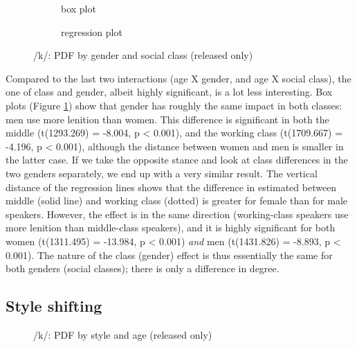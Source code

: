 \begin{figure}[h]
	\centering
	\begin{subfigure}{.49\textwidth}
		\centering
			\resizebox{\linewidth}{!}{} 
		\caption{box plot}
		\label{fig.box.k.classgender}
	\end{subfigure}
	\begin{subfigure}{.49\textwidth}
		\centering
			\resizebox{\linewidth}{!}{} 
		\caption{regression plot}
		\label{fig.scatter.k.classgender}
	\end{subfigure}
	\caption{/k/: PDF by gender and social class (released only)}
\end{figure}

Compared to the last two interactions (age X gender, and age X social class), the one of class and gender, albeit highly significant, is a lot less interesting.
Box plots (Figure \ref{fig.box.k.classgender}) show that gender has roughly the same impact in both classes: men use more lenition than women.
This difference is significant in both the middle (t(1293.269) = -8.004, p < 0.001), and the working class (t(1709.667) = -4.196, p < 0.001), although the distance between women and men is smaller in the latter case.
If we take the opposite stance and look at class differences in the two genders separately, we end up with a very similar result.
The vertical distance of the regression lines shows that the difference in estimated  between middle (solid line) and working class (dotted) is greater for female than for male speakers.
However, the effect is in the same direction (working-class speakers use more lenition than middle-class speakers), and it is highly significant for both women (t(1311.495) = -13.984, p < 0.001) \emph{and} men (t(1431.826) = -8.893, p < 0.001).
The nature of the class (gender) effect is thus essentially the same for both genders (social classes); there is only a difference in degree.

\subsection{Style shifting}
\label{sec.prod.res.con.k.shifting}

\begin{figure}[h]
	\centering
		\resizebox{0.5\linewidth}{!}{} 
	\caption{/k/: PDF by style and age (released only)}
	\label{fig.line.k.tot}
\end{figure}

